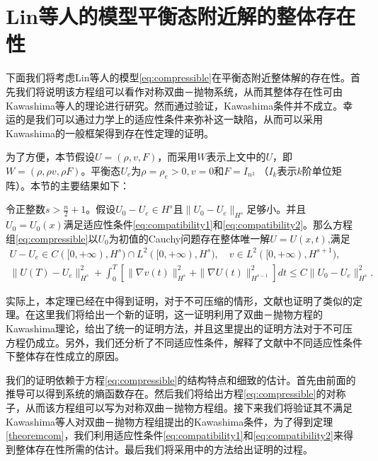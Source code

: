 \section{Lin等人的模型平衡态附近解的整体存在性}

下面我们将考虑Lin等人的模型\eqref{eq:compressible}在平衡态附近整体解的存在性。首先我们将说明该方程组可以看作对称双曲－抛物系统，从而其整体存在性可由Kawashima等人的理论\cite{kawashima1984systems,kawashima1985systems,yong2004entropy}进行研究。然而通过验证，Kawashima条件并不成立。幸运的是我们可以通过力学上的适应性条件来弥补这一缺陷，从而可以采用Kawashima的一般框架得到存在性定理的证明。

为了方便，本节假设$U = (\rho, v ,F)$，而采用$W$表示上文中的$U$，即$W=(\rho, \rho v ,\rho F)$。平衡态$U_e$为$\rho=\rho_e>0,  v =0 $和$F=I_{n^2}$ （$I_k$表示$k$阶单位矩阵）。本节的主要结果如下：
\begin{theorem}\label{theoremcom}
令正整数$s > \frac{n}{2}+1$。假设$U_0-U_e\in H^s$且$\|U_0-U_e\|_{H^s}$足够小。并且$U_0 = U_0(x)$满足适应性条件\eqref{eq:compatibility1}和\eqref{eq:compatibility2}。那么方程组\eqref{eq:compressible}以$U_0$为初值的Cauchy问题存在整体唯一解$U=U(x,t)$,满足
    \begin{eqnarray}\label{eq:thmincom}
       U - U_e\in C([0,+\infty), H^s) \cap L^2([0,+\infty), H^{s}), \nonumber \quad
         v \in L^2([0,+\infty), H^{s+1}),\\[2mm]
      \|U(T)-U_e\|_{H^s}^2 +  \int_0^T \left[\|\nabla  v (t) \|_{H^s}^2 + \|\nabla U(t)\|_{H^{s-1}}^2\right] dt
      \le C \|U_0-U_e\|_{H^s}^2 .
    \end{eqnarray}
\end{theorem}

实际上，本定理已经在\cite{qian2010global,hu2011global}中得到证明，对于不可压缩的情形，文献\cite{lin2005hydrodynamics,lei2008global,chen2006global}也证明了类似的定理。在这里我们将给出一个新的证明，这一证明利用了双曲－抛物方程的Kawashima理论，给出了统一的证明方法，并且这里提出的证明方法对于不可压方程仍成立。另外，我们还分析了不同适应性条件，解释了文献\cite{lin2005hydrodynamics,lei2008global,chen2006global,qian2010global,hu2011global}中不同适应性条件下整体存在性成立的原因。

我们的证明依赖于方程\eqref{eq:compressible}的结构特点和细致的估计。首先由前面的推导可以得到系统的熵函数存在。然后我们将给出方程\eqref{eq:compressible}的对称子，从而该方程组可以写为对称双曲－抛物方程组。接下来我们将验证其不满足Kawashima等人对双曲－抛物方程组提出的Kawashima条件，为了得到定理\ref{theoremcom}，我们利用适应性条件\eqref{eq:compatibility1}和\eqref{eq:compatibility2}来得到整体存在性所需的估计。最后我们将采用\cite{kawashima1984systems,yong2004entropy}中的方法给出证明的过程。

